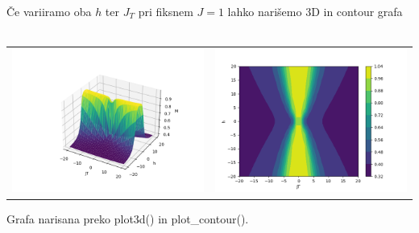 \documentclass{article}
\begin{document}
\noindent Če variiramo oba $h$ ter $J_T$ pri fiksnem $J = 1$ lahko narišemo 3D in contour grafa\\\\

\begin{tabular}{c c}
     \includegraphics[width = .5 \linewidth]{2TFIM1.png}
     &  
     \includegraphics[width = .5 \linewidth]{2TFIM2.png}\\
\end{tabular}
Grafa narisana preko plot3d() in plot\_contour().
\end{document}
